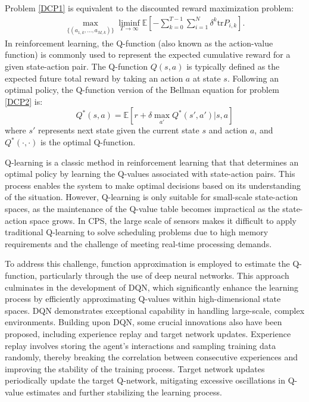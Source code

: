 \documentclass[twocolumn]{IEEEtran}
\begin{document}
Problem \eqref{DCP1} is equivalent to the discounted reward maximization problem:
\begin{equation} \label{DCP2}
\begin{split}
\max_{{\{(a_{1,k},...,a_{M,k})\}}}\liminf_{T\to\infty}\mathbb{E}\left[-\sum_{k=0}^{T-1}\sum_{i=1}^{N}\delta^{k}\mathrm{tr}P_{i,k}\right]\text{.}
\end{split}
\end{equation}
In reinforcement learning, the Q-function (also known as the action-value function) is commonly used to represent the expected cumulative reward for a given state-action pair. The Q-function $Q(s,a)$ is typically defined as the expected future total reward by taking an action $a$ at state $s$. Following an optimal policy, the Q-function version of the Bellman equation for problem \eqref{DCP2} is:
\begin{equation}
Q^*(s,a)=\mathbb{E}\left[r+\delta\max_{a'}Q^*(s',a')\Big| s,a\right]
\end{equation}
where $s'$ represents next state given the current state $s$ and action $a$, and $Q^*(\cdot,\cdot)$ is the optimal Q-function.

Q-learning is a classic method in reinforcement learning that that determines an optimal policy by learning the Q-values associated with state-action pairs. This process enables the system to make optimal decisions based on its understanding of the situation. However, Q-learning is only suitable for small-scale state-action spaces, as the maintenance of the Q-value table becomes impractical as the state-action space grows. In CPS, the large scale of sensors makes it difficult to apply traditional Q-learning to solve scheduling problems due to high memory requirements and the challenge of meeting real-time processing demands.

To address this challenge, function approximation is employed to estimate the Q-function, particularly through the use of deep neural networks. This approach culminates in the development of DQN, which significantly enhance the learning process by efficiently approximating Q-values within high-dimensional state spaces. DQN demonstrates exceptional capability in handling large-scale, complex environments. Building upon DQN, some crucial innovations also have been proposed, including experience replay and target network updates. Experience replay involves storing the agent's interactions and sampling training data randomly, thereby breaking the correlation between consecutive experiences and improving the stability of the training process. Target network updates periodically update the target Q-network, mitigating excessive oscillations in Q-value estimates and further stabilizing the learning process.
\end{document}
